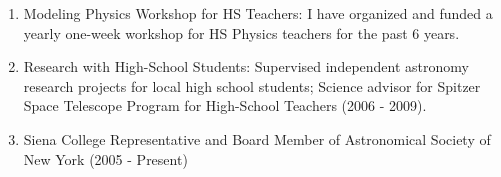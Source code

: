 \documentclass[11pt]{article}
\begin{document}
\begin{flushleft}
\begin{enumerate}
\vspace{-.2cm}\item Modeling Physics Workshop for HS Teachers:  I have organized and
  funded a yearly one-week workshop for HS Physics teachers for the
  past 6 years.
\vspace{-.2cm}\item{Research with High-School Students: } Supervised independent astronomy research projects for local high
school students; %
Science advisor for Spitzer Space Telescope Program for High-School Teachers (2006 - 2009).
\vspace{-.2cm}\item{Siena College Representative and Board Member of
  Astronomical Society of New York (2005 - Present)} 
\vspace{-.2cm}

\end{enumerate}
\end{flushleft}
\end{document}
